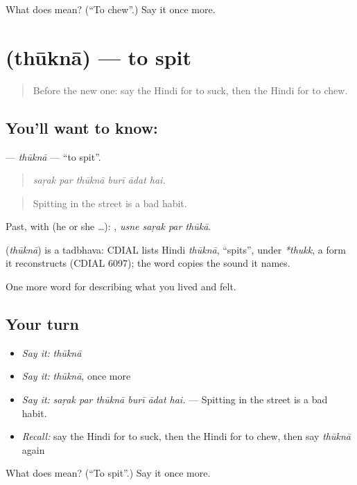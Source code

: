 \begin{tcolorbox}[breakable,colback=teal!4,colframe=teal!35!black,title={Before you move on}]
What does  mean? (\textquotedblleft{}To chew\textquotedblright{}.) Say it once more.
\end{tcolorbox}
\section[\texorpdfstring{\hi{थूकना} (thūknā)}{थूकना (thūknā)}]{ (thūknā) — to spit}

\label{lesson:HI-C479-thukna}



\begin{quote}
Before the new one: say the Hindi for to suck, then the Hindi for to chew.
\end{quote}

\subsection*{You'll want to know: }
\textbf{} — \emph{thūknā} — \textquotedblleft{}to spit\textquotedblright{}.

\begin{quote}
     
\end{quote}

\begin{quote}
\emph{saṛak par thūknā burī ādat hai.}
\end{quote}

\begin{quote}
Spitting in the street is a bad habit.
\end{quote}

Past, with  (he or she …):    , \emph{usne saṛak par thūkā}.

\begin{cousinweb}
\textbf{} (\emph{thūknā}) is a tadbhava: CDIAL lists Hindi \emph{thūknā}, \textquotedblleft{}spits\textquotedblright{}, under \emph{*thukk}, a form it reconstructs (CDIAL 6097); the word copies the sound it names.
\end{cousinweb}

\begin{grammarlens}[title={What you've built}]
One more word for describing what you lived and felt.
\end{grammarlens}

\subsection*{Your turn}
\begin{itemize}
\raggedright
  \item \emph{Say it:} \emph{thūknā}
  \item \emph{Say it:} \emph{thūknā}, once more
  \item \emph{Say it:} \emph{saṛak par thūknā burī ādat hai.} — Spitting in the street is a bad habit.
  \item \emph{Recall:} say the Hindi for to suck, then the Hindi for to chew, then say \emph{thūknā} again
\end{itemize}

\begin{tcolorbox}[breakable,colback=teal!4,colframe=teal!35!black,title={Before you move on}]
What does  mean? (\textquotedblleft{}To spit\textquotedblright{}.) Say it once more.
\end{tcolorbox}
